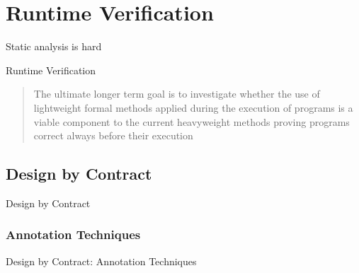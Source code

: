 \documentclass[12pt]{beamer}
\begin{document}

\section{Runtime Verification}
\label{sec:runver}

\begin{frame}
  \begin{center}
    \Large Static analysis is hard

  \end{center}
\end{frame}

\begin{frame}{Runtime Verification}

  \begin{quote}
    The ultimate longer term goal is to investigate whether the use of
    lightweight formal methods applied during the execution of
    programs is a viable component to the current heavyweight methods
    proving programs correct always before their execution

  \end{quote}
\end{frame}


\subsection{Design by Contract}
\label{sec:runver-dbc}

\begin{frame}{Design by Contract}

\end{frame}

\subsubsection{Annotation Techniques}
\label{sec:runver-dbc-ann}

\begin{frame}{Design by Contract: Annotation Techniques}

\end{frame}
\end{document}
